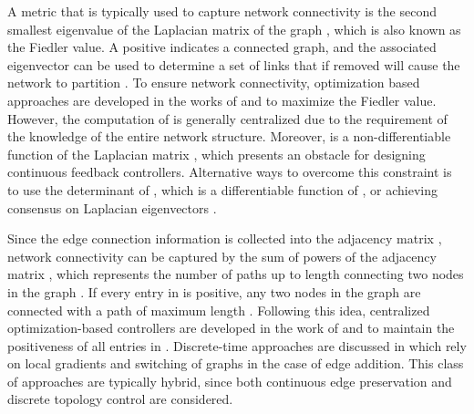 \documentclass[english]{IOS-Book-Article}
\theoremstyle{definition}
\theoremstyle{definition}
\begin{document}
A metric that is typically used to capture network connectivity is
the second smallest eigenvalue 
of the Laplacian matrix  of the graph ,
which is also known as the Fiedler value\cite{Godsil2001}. A positive
 indicates a connected graph,
and the associated eigenvector can be used to determine a set of links
that if removed will cause the network to partition \cite{RM_LAA:94}.
To ensure network connectivity, optimization based approaches are
developed in the works of \cite{kim2006} and \cite{DeGennaro2006}
to maximize the Fiedler value. However, the computation of 
is generally centralized due to the requirement of the knowledge of
the entire network structure. Moreover, 
is a non-differentiable function of the Laplacian matrix ,
which presents an obstacle for designing continuous feedback controllers.
Alternative ways to overcome this constraint is to use the determinant
of  \cite{Zavlanos2007a}, which is a differentiable
function of , or achieving consensus on Laplacian eigenvectors
\cite{Yang2010}. 

Since the edge connection information is collected into the adjacency
matrix , network connectivity can be captured
by the sum of powers of the adjacency matrix ,
which represents the number of paths up to length  connecting
two nodes in the graph  \cite{Godsil2001}. If every
entry in  is positive, any two nodes in the
graph  are connected with a path of maximum length .
Following this idea, centralized optimization-based controllers are
developed in the work of \cite{Zavlanos2005} and \cite{srivastava2008}
to maintain the positiveness of all entries in .
Discrete-time approaches are discussed in \cite{Notarstefano2006,Bullo2009,Spanos2004,dimarogonas2008_R}
which rely on local gradients and switching of graphs in the case
of edge addition. This class of approaches are typically hybrid, since
both continuous edge preservation and discrete topology control are
considered.
\end{document}
